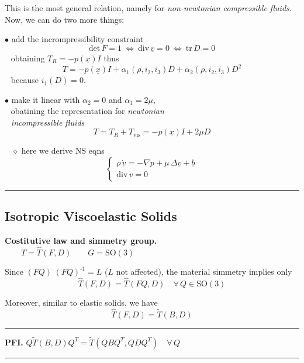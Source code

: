 \smallskip

This is the most general relation, namely for \emph{non-newtonian compressible fluids}. Now, we can do two more things:

\smallskip

$ \bullet $ add the incrompressibility constraint
\begin{equation*}
\text{det}\,F=1\ \Leftrightarrow\ \text{div}\,\underline{v}=0 \ \Leftrightarrow\ \text{tr}\,D=0
\end{equation*}
$\ \ $ obtaining $T_R=-p(\underline{x})I$ thus
\begin{equation*}
T=-p(\underline{x})I+\alpha_1(\rho,i_2,i_3)D+\alpha_2(\rho,i_2,i_3)D^2
\end{equation*}
$\ \ $ because $i_1(D)=0$.

\smallskip

$ \bullet $ make it linear with $\alpha_2=0$ and $\alpha_1=2\mu$, \\
$\ \ $ obatining the representation for \emph{newtonian} \\
$\ \ $ \emph{incompressible fluids}
\begin{equation*}
T=T_R+T_{\text{vis}}=-p(\underline{x})I+2\mu D
\end{equation*}

$\ \ \ \ \diamond$ here we derive NS eqns
\begin{equation*}
\begin{cases}
\rho\,\dot{\underline{v}}=-\nabla p+\mu\,\Delta \underline{v}+ \underline{b} \\
\text{div}\,\underline{v}=0
\end{cases}
\end{equation*}

\rule{0.31\textwidth}{0.2pt}


\subsection{\texorpdfstring{\color{red}Isotropic Viscoelastic Solids}{}}


\textbf{Costitutive law and simmetry group.} \\
$\qquad T=\hat{T}(F,D)\qquad G=\text{SO}(3)$

Since $(FQ)^\cdot(FQ)^{\text{-}1}=L$ ($L$ not affected), the material simmetry implies only
\begin{equation*}
\hat{T}(F,D)=\hat{T}(FQ,D)\quad\forall\,Q\in\text{SO}(3)
\end{equation*}

Moreover, similar to elastic solids, we have
\begin{equation*}
\boxed{\hat{T}(F,D)=\widetilde{T}(B,D)}
\end{equation*}

\rule{0.31\textwidth}{0.2pt}
\smallskip

\textbf{PFI.} $Q\widetilde{T}(B,D)Q^T=\widetilde{T}(QBQ^T,QDQ^T)\quad\forall\,Q$

\rule{0.31\textwidth}{1pt}








